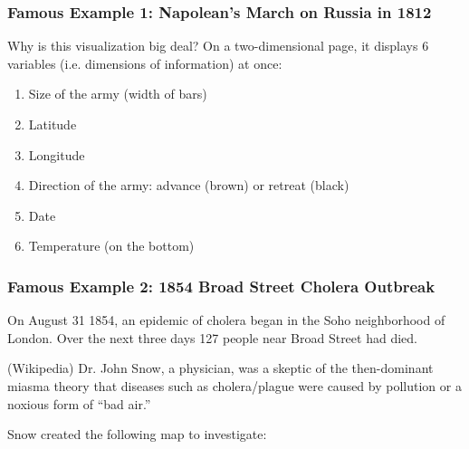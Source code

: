 \documentclass[handout]{beamer}
\newcommand{\blue}[1]{\textcolor{blue2}{#1}}
\begin{document}
\begin{frame}
\frametitle{Famous Example 1:  Napolean's March on Russia in 1812}
Why is this visualization big deal?  On a two-dimensional page, it displays 6 variables (i.e. \blue{dimensions} of information) at once:
\begin{enumerate}
\pause \item Size of the army (width of bars)
\pause \item Latitude
\pause \item Longitude
\pause \item Direction of the army:  advance (brown) or retreat (black)
\pause \item Date
\pause \item Temperature (on the bottom)
\end{enumerate}


\end{frame}


\begin{frame}
\frametitle{Famous Example 2:  1854 Broad Street Cholera Outbreak}

On August 31 1854, an epidemic of cholera began in the Soho neighborhood of London.  Over the next three days 127 people near Broad Street had died.

\vspace{0.25cm}

\pause (Wikipedia) Dr. John Snow, a physician, was a skeptic of the then-dominant \blue{miasma theory} that diseases such as cholera/plague were caused by pollution or a noxious form of ``bad air.'' 

\vspace{0.25cm}

\pause Snow created the following map to investigate:

\end{frame}
\end{document}
